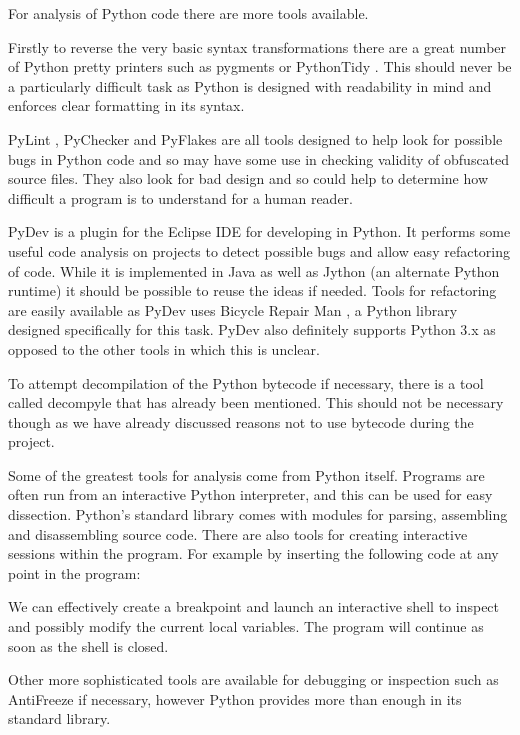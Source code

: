\documentclass{report}
\begin{document}
For analysis of Python code there are more tools available.

Firstly to reverse the very basic syntax transformations there are a great number of Python pretty printers such as
pygments \cite{pygments} or PythonTidy \cite{pythontidy}. This should never be a particularly difficult task as Python is
designed with readability in mind and enforces clear formatting in its syntax.

PyLint \cite{pylint}, PyChecker \cite{pychecker} and PyFlakes \cite{pyflakes} are all tools designed to help look for possible
bugs in Python code and so may have some use in checking validity of obfuscated source files. They also look for bad design and so
could help to determine how difficult a program is to understand for a human reader.

PyDev \cite{pydev} is a plugin for the Eclipse IDE for developing in Python. It performs some useful code analysis on projects to detect
possible bugs and allow easy refactoring of code. While it is implemented in Java as well as Jython (an alternate Python runtime)
it should be possible to reuse the ideas if needed. Tools for refactoring are easily available as PyDev uses Bicycle Repair
Man \cite{bikerepair}, a Python library designed specifically for this task. PyDev also definitely supports Python 3.x as opposed to the
other tools in which this is unclear.

To attempt decompilation of the Python bytecode if necessary, there is a tool called decompyle \cite{decompyle} that has already been
mentioned. This should not be necessary though as we have already discussed reasons not to use bytecode during the project.

Some of the greatest  tools for analysis come from Python itself. Programs are often run from an interactive Python interpreter, and this
can be used for easy dissection. Python's standard library comes with modules for parsing, assembling and disassembling source code.
There are also tools for creating interactive sessions within the program. For example by inserting the following code at any point
in the program:



We can effectively create a breakpoint and launch an interactive shell to inspect and possibly modify the current local
variables. The program will continue as soon as the shell is closed.

Other more sophisticated tools are available for debugging or inspection such as AntiFreeze \cite{pirates} if necessary,
however Python provides more than enough in its standard library.
\end{document}
